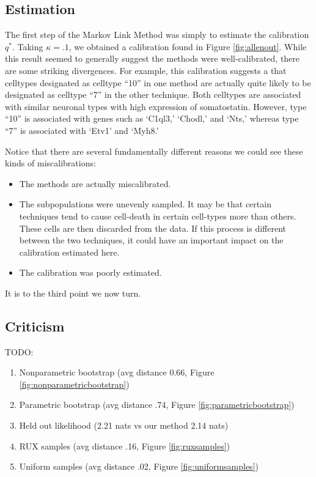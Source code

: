 \subsection{Estimation}

The first step of the Markov Link Method was simply to estimate the calibration $q^*$.  Taking $\kappa=.1$, we obtained a calibration found in Figure \ref{fig:allenout}.  While this result seemed to generally suggest the methods were well-calibrated, there are some striking divergences.  For example, this calibration suggests a that celltypes designated as celltype ``10'' in one method are actually quite likely to be designated as celltype ``7'' in the other technique.  Both celltypes are associated with similar neuronal types with high expression of somatostatin.  However, type ``10'' is associated with genes such as `C1ql3,' `Chodl,'  and `Nts,' whereas type ``7'' is associated with `Etv1' and `Myh8.'  

Notice that there are several fundamentally different reasons we could see these kinds of miscalibrations:

\begin{itemize}
    \item The methods are actually miscalibrated.
    \item The subpopulations were unevenly sampled.  It may be that certain techniques tend to cause cell-death in certain cell-types more than others.  These cells are then discarded from the data.  If this process is different between the two techniques, it could have an important impact on the calibration estimated here.
    \item The calibration was poorly estimated.
\end{itemize}

It is to the third point we now turn.

\subsection{Criticism}

TODO:
\begin{enumerate}
\item Nonparametric bootstrap (avg distance 0.66, Figure \ref{fig:nonparametricbootstrap})
\item Parametric bootstrap (avg distance .74, Figure \ref{fig:parametricbootstrap})
\item Held out likelihood (2.21 nats vs our method 2.14 nats)
\item RUX samples (avg distance .16, Figure \ref{fig:ruxsamples})
\item Uniform samples (avg distance .02, Figure \ref{fig:uniformsamples})
\end{enumerate}

